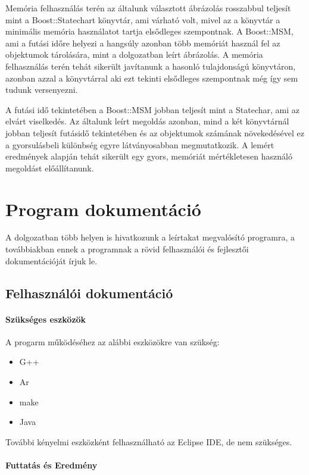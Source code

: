 \documentclass[a4paper,12pt]{report}
\begin{document}
Memória felhasználás terén az általunk választott ábrázolás rosszabbul teljesít mint a Boost::Statechart könyvtár, ami várható volt, mivel az a könyvtár a minimális memória használatot tartja elsődleges szempontnak. A Boost::MSM, ami a futási időre helyezi a hangsúly azonban több memóriát használ fel az objektumok tárolására, mint a dolgozatban leírt ábrázolás. A memória felhasználás terén tehát sikerült javítanunk a hasonló tulajdonságú könyvtáron, azonban azzal a könyvtárral aki ezt tekinti elsődleges szempontnak még így sem tudunk versenyezni.

A futási idő tekintetében a Boost::MSM jobban teljesít mint a Statechar, ami az elvárt viselkedés. Az általunk leírt megoldás azonban, mind a két könyvtárnál jobban teljesít futásidő tekintetében és az objektumok számának növekedésével ez a gyorsulásbeli különbség egyre látványosabban megmutatkozik.
A lemért eredmények alapján tehát sikerült egy gyors, memóriát mértékletesen használó megoldást előállítanunk.

\chapter{Program dokumentáció}

A dolgozatban több helyen is hivatkozunk a leírtakat megvalósító programra, a továbbiakban ennek a programnak a rövid felhasználói és fejlesztői dokumentációját írjuk le.

\section{Felhasználói dokumentáció}

\subsubsection{Szükséges eszközök}

A progarm működéséhez az alábbi eszközökre van szükség:
\begin{itemize}
\item G++
\item Ar
\item make
\item Java 
\end{itemize}
További kényelmi eszközként felhasználható az Eclipse IDE, de nem szükséges.

\subsubsection{Futtatás és Eredmény}
\end{document}
